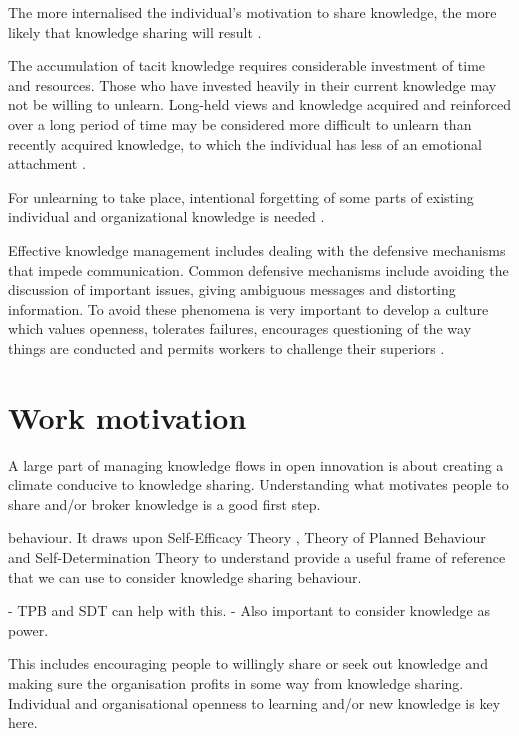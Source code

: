 The more internalised the individual’s motivation to share knowledge, the more likely that knowledge sharing will result \citep{gagne2009model,witherspoon2013antecedents}.

The accumulation of tacit knowledge requires considerable investment of time and resources. Those who have invested heavily in their current knowledge may not be willing to unlearn. Long-held views and knowledge acquired and reinforced over a long period of time may be considered more difficult to unlearn than recently acquired knowledge, to which the individual has less of an emotional attachment \citep{rebernik2007fostering}.

For unlearning to take place, intentional forgetting of some parts of existing individual and organizational knowledge is needed \citep{rebernik2007fostering}.

Effective knowledge management includes dealing with the defensive mechanisms that impede communication. Common defensive mechanisms include avoiding the discussion of important issues, giving ambiguous messages and distorting information. To avoid these phenomena is very important to develop a culture which values openness, tolerates failures, encourages questioning of the way things are conducted and permits workers to challenge their superiors \citep{lubit2001keys}.




\section{Work motivation}

A large part of managing knowledge flows in open innovation is about creating a climate conducive to knowledge sharing. Understanding what motivates people to share and/or broker knowledge is a good first step. \medskip



behaviour. It draws upon Self-Efficacy Theory \citep{bandura1994self}, Theory of Planned Behaviour \citep{ajzen1991theory} and Self-Determination Theory \citep{deci1985general} to understand  provide a useful frame of reference that we can use to consider knowledge sharing behaviour.


- TPB and SDT can help with this.
- Also important to consider knowledge as power.

This includes encouraging people to willingly share or seek out knowledge and making sure the organisation profits in some way from knowledge sharing. Individual and organisational openness to learning and/or new knowledge is key here.

